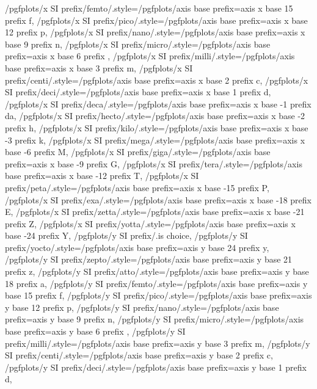{    /pgfplots/x SI prefix/femto/.style={/pgfplots/axis base prefix={axis x base 15 prefix f}},%
    /pgfplots/x SI prefix/pico/.style={/pgfplots/axis base prefix={axis x base 12 prefix p}},%
    /pgfplots/x SI prefix/nano/.style={/pgfplots/axis base prefix={axis x base 9 prefix n}},%
    /pgfplots/x SI prefix/micro/.style={/pgfplots/axis base prefix={axis x base 6 prefix \mu}},%
    /pgfplots/x SI prefix/milli/.style={/pgfplots/axis base prefix={axis x base 3 prefix m}},%
    /pgfplots/x SI prefix/centi/.style={/pgfplots/axis base prefix={axis x base 2 prefix c}},%
    /pgfplots/x SI prefix/deci/.style={/pgfplots/axis base prefix={axis x base 1 prefix d}},%
    /pgfplots/x SI prefix/deca/.style={/pgfplots/axis base prefix={axis x base -1 prefix da}},%
    /pgfplots/x SI prefix/hecto/.style={/pgfplots/axis base prefix={axis x base -2 prefix h}},%
    /pgfplots/x SI prefix/kilo/.style={/pgfplots/axis base prefix={axis x base -3 prefix k}},%
    /pgfplots/x SI prefix/mega/.style={/pgfplots/axis base prefix={axis x base -6 prefix M}},%
    /pgfplots/x SI prefix/giga/.style={/pgfplots/axis base prefix={axis x base -9 prefix G}},%
    /pgfplots/x SI prefix/tera/.style={/pgfplots/axis base prefix={axis x base -12 prefix T}},%
    /pgfplots/x SI prefix/peta/.style={/pgfplots/axis base prefix={axis x base -15 prefix P}},%
    /pgfplots/x SI prefix/exa/.style={/pgfplots/axis base prefix={axis x base -18 prefix E}},%
    /pgfplots/x SI prefix/zetta/.style={/pgfplots/axis base prefix={axis x base -21 prefix Z}},%
    /pgfplots/x SI prefix/yotta/.style={/pgfplots/axis base prefix={axis x base -24 prefix Y}},%
    /pgfplots/y SI prefix/.is choice,%
    /pgfplots/y SI prefix/yocto/.style={/pgfplots/axis base prefix={axis y base 24 prefix y}},%
    /pgfplots/y SI prefix/zepto/.style={/pgfplots/axis base prefix={axis y base 21 prefix z}},%
    /pgfplots/y SI prefix/atto/.style={/pgfplots/axis base prefix={axis y base 18 prefix a}},%
    /pgfplots/y SI prefix/femto/.style={/pgfplots/axis base prefix={axis y base 15 prefix f}},%
    /pgfplots/y SI prefix/pico/.style={/pgfplots/axis base prefix={axis y base 12 prefix p}},%
    /pgfplots/y SI prefix/nano/.style={/pgfplots/axis base prefix={axis y base 9 prefix n}},%
    /pgfplots/y SI prefix/micro/.style={/pgfplots/axis base prefix={axis y base 6 prefix \mu}},%
    /pgfplots/y SI prefix/milli/.style={/pgfplots/axis base prefix={axis y base 3 prefix m}},%
    /pgfplots/y SI prefix/centi/.style={/pgfplots/axis base prefix={axis y base 2 prefix c}},%
    /pgfplots/y SI prefix/deci/.style={/pgfplots/axis base prefix={axis y base 1 prefix d}},%
}
